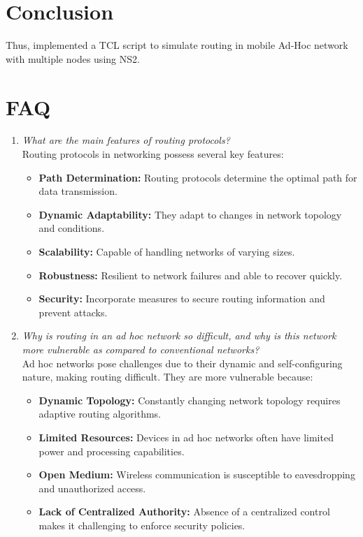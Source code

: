 \documentclass[11pt]{article}
\begin{document}


\section{Conclusion}
Thus, implemented a TCL script to simulate routing in mobile Ad-Hoc network with
multiple nodes using NS2.
\clearpage

\section{FAQ}

\begin{enumerate}

    \item \textit{What are the main features of routing protocols?}\\

          Routing protocols in networking possess several key features:
          \begin{itemize}
              \item \textbf{Path Determination:} Routing protocols determine the optimal path for data transmission.
              \item \textbf{Dynamic Adaptability:} They adapt to changes in network topology and conditions.
              \item \textbf{Scalability:} Capable of handling networks of varying sizes.
              \item \textbf{Robustness:} Resilient to network failures and able to recover quickly.
              \item \textbf{Security:} Incorporate measures to secure routing information and prevent attacks.
          \end{itemize}

    \item \textit{Why is routing in an ad hoc network so difficult, and why is this network more vulnerable as compared to conventional networks?}\\

          Ad hoc networks pose challenges due to their dynamic and self-configuring nature, making routing difficult. They are more vulnerable because:
          \begin{itemize}
              \item \textbf{Dynamic Topology:} Constantly changing network topology requires adaptive routing algorithms.
              \item \textbf{Limited Resources:} Devices in ad hoc networks often have limited power and processing capabilities.
              \item \textbf{Open Medium:} Wireless communication is susceptible to eavesdropping and unauthorized access.
              \item \textbf{Lack of Centralized Authority:} Absence of a centralized control makes it challenging to enforce security policies.
          \end{itemize}


\end{enumerate}
\end{document}
